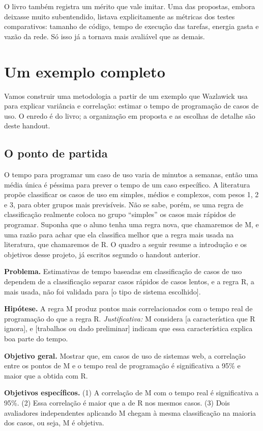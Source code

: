 \documentclass[10pt,a4paper]{extarticle}
\theoremstyle{definition}
\begin{document}
O livro também registra um mérito que vale imitar. Uma das propostas, embora deixasse muito subentendido, listava explicitamente as métricas dos testes comparativos: tamanho de código, tempo de execução das tarefas, energia gasta e vazão da rede. Só isso já a tornava mais avaliável que as demais.

\section{Um exemplo completo}\label{sec:exemplo}

Vamos construir uma metodologia a partir de um exemplo que Wazlawick usa para explicar variância e correlação: estimar o tempo de programação de casos de uso. O enredo é do livro; a organização em proposta e as escolhas de detalhe são deste handout.

\subsection{O ponto de partida}

O tempo para programar um caso de uso varia de minutos a semanas, então uma média única é péssima para prever o tempo de um caso específico. A literatura propõe classificar os casos de uso em simples, médios e complexos, com pesos 1, 2 e 3, para obter grupos mais previsíveis. Não se sabe, porém, se uma regra de classificação realmente coloca no grupo \enquote{simples} os casos mais rápidos de programar. Suponha que o aluno tenha uma regra nova, que chamaremos de M, e uma razão para achar que ela classifica melhor que a regra mais usada na literatura, que chamaremos de R. O quadro a seguir resume a introdução e os objetivos desse projeto, já escritos segundo o handout anterior.

\begin{keybox}
\textbf{Problema.} Estimativas de tempo baseadas em classificação de casos de uso dependem de a classificação separar casos rápidos de casos lentos, e a regra R, a mais usada, não foi validada para [o tipo de sistema escolhido].

\textbf{Hipótese.} A regra M produz pontos mais correlacionados com o tempo real de programação do que a regra R. \emph{Justificativa:} M considera [a característica que R ignora], e [trabalhos ou dado preliminar] indicam que essa característica explica boa parte do tempo.

\textbf{Objetivo geral.} Mostrar que, em casos de uso de sistemas web, a correlação entre os pontos de M e o tempo real de programação é significativa a 95\% e maior que a obtida com R.

\textbf{Objetivos específicos.} (1) A correlação de M com o tempo real é significativa a 95\%. (2) Essa correlação é maior que a de R nos mesmos casos. (3) Dois avaliadores independentes aplicando M chegam à mesma classificação na maioria dos casos, ou seja, M é objetiva.
\end{keybox}
\end{document}
